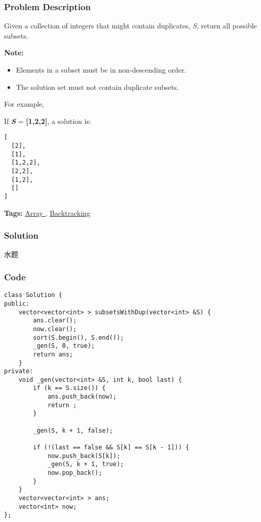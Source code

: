 \documentclass{article}
\begin{document}
\begin{CJK*}{UTF8}{gkai}
\subsubsection*{Problem Description}
Given a collection of integers that might contain duplicates, \emph{S}, return all possible subsets.

\textbf{Note:}



\begin{itemize}
\item Elements in a subset must be in non-descending order.
\item The solution set must not contain duplicate subsets.
\end{itemize}

For example,


If \textbf{\emph{S}} = \textbf{[1,2,2]}, a solution is:

\begin{verbatim}
[
  [2],
  [1],
  [1,2,2],
  [2,2],
  [1,2],
  []
]
\end{verbatim}

\textbf{Tags: }
\hyperref[ Array ]{ Array },  \hyperref[ Backtracking ]{ Backtracking }



\subsubsection*{Solution}
水题

\subsubsection*{Code}
\begin{lstlisting}
class Solution {
public:
    vector<vector<int> > subsetsWithDup(vector<int> &S) {
        ans.clear();
        now.clear();
        sort(S.begin(), S.end());
        _gen(S, 0, true);
        return ans;
    }
private:
    void _gen(vector<int> &S, int k, bool last) {
        if (k == S.size()) {
            ans.push_back(now);
            return ;
        }
        
        _gen(S, k + 1, false);
        
        if (!(last == false && S[k] == S[k - 1])) {
            now.push_back(S[k]);
            _gen(S, k + 1, true);
            now.pop_back();
        }
    }
    vector<vector<int> > ans;
    vector<int> now;
}; 
\end{lstlisting}



\end{CJK*}
\end{document}
